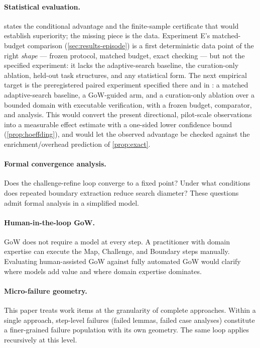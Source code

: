 \documentclass[11pt]{article}
\theoremstyle{gowthm}
\theoremstyle{gowplain}
\begin{document}
\paragraph{Statistical evaluation.}
 states the conditional advantage and the finite-sample
certificate that would establish superiority; the missing piece is the data.
Experiment E's matched-budget comparison (\cref{sec:results-episode}) is a
first deterministic data point of the right \emph{shape} --- frozen protocol,
matched budget, exact checking --- but not the specified experiment: it lacks
the adaptive-search baseline, the curation-only ablation, held-out task
structures, and any statistical form. The
next empirical target is the preregistered paired experiment specified there and
in : a matched
adaptive-search baseline, a GoW-guided arm, and a curation-only ablation over a
bounded domain with executable verification, with a frozen budget, comparator,
and analysis. This would convert the present directional, pilot-scale
observations into a measurable effect estimate with a one-sided lower confidence
bound (\cref{prop:hoeffding}), and would let the observed advantage be checked
against the enrichment/overhead prediction of \cref{prop:exact}.

\paragraph{Formal convergence analysis.}
Does the challenge-refine loop converge to a fixed point? Under what conditions
does repeated boundary extraction reduce search diameter? These questions admit
formal analysis in a simplified model.

\paragraph{Human-in-the-loop GoW.}
GoW does not require a model at every step. A practitioner with domain expertise
can execute the Map, Challenge, and Boundary steps manually. Evaluating
human-assisted GoW against fully automated GoW would clarify where models add
value and where domain expertise dominates.

\paragraph{Micro-failure geometry.}
This paper treats work items at the granularity of complete approaches. Within
a single approach, step-level failures (failed lemmas, failed case analyses)
constitute a finer-grained failure population with its own geometry. The same
loop applies recursively at this level.
\end{document}
